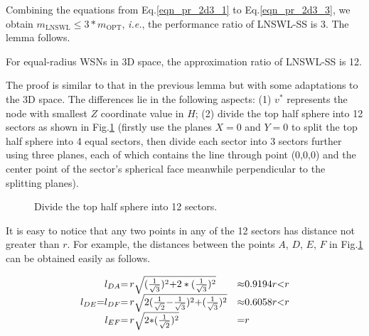\documentclass[journal,10pt]{IEEEtran}
\begin{document}
\begin{IEEEproof}
Combining the equations from Eq.\eqref{eqn_pr_2d3_1} to Eq.\eqref{eqn_pr_2d3_3}, we obtain $m_\text{LNSWL}{\leq}3{*}m_\text{OPT}$, \textit{i.e.}, the performance ratio of LNSWL-SS is 3. The lemma follows.
\end{IEEEproof}

\begin{lemma}
\label{lemma_3d_ratio12}
For equal-radius WSNs in 3D space, the approximation ratio of LNSWL-SS is 12.
\end{lemma}

\begin{IEEEproof}
The proof is similar to that in the previous lemma but with some adaptations to the 3D space. The differences lie in the following aspects: (1) $v^{*}$ represents the node with smallest $Z$ coordinate value in $H$; (2) divide the top half sphere into 12 sectors as shown in Fig.\ref{fig_3d12part} (firstly use the planes $X{=}0$ and $Y{=}0$ to split the top half sphere into 4 equal sectors, then divide each sector into 3 sectors further using three planes, each of which contains the line through point (0,0,0) and the center point of the sector's spherical face meanwhile perpendicular to the splitting planes).

\begin{figure}[htb]
\caption{Divide the top half sphere into 12 sectors.}
\label{fig_3d12part}
\end{figure}

It is easy to notice that any two points in any of the 12 sectors has distance not greater than $r$. For example, the distances between the points $A$, $D$, $E$, $F$ in Fig.\ref{fig_3d12part} can be obtained easily as follows.

\begin{equation}
\label{eqn_pr_3d12_1}
\begin{array}{rll}
l_{DA}{=}&\hspace{-3mm}r\sqrt{(\frac{1}{\sqrt{3}})^2{+}2*(\frac{1}{\sqrt{3}})^2}&{\approx}0.9194r{<}r\\
l_{DE}{=}l_{DF}{=}&\hspace{-3mm}r\sqrt{2(\frac{1}{\sqrt{2}}{-}\frac{1}{\sqrt{3}})^2{+}(\frac{1}{\sqrt{3}})^2}&{\approx}0.6058r{<}r\\
l_{EF}{=}&\hspace{-3mm}r\sqrt{2{*}(\frac{1}{\sqrt{2}})^2}&{=}r
\end{array}
\end{equation}


\end{IEEEproof}
\end{document}
